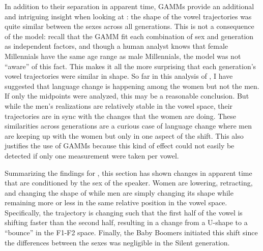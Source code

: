 In addition to their separation in apparent time, GAMMs provide an additional and intriguing insight when looking at \bet: the shape of the vowel trajectories was quite similar between the sexes across all generations. This is not a consequence of the model: recall that the GAMM fit each combination of sex and generation as independent factors, and though a human analyst knows that female Millennials have the same age range as male Millennials, the model was not ``aware'' of this fact. This makes it all the more surprising that each generation's vowel trajectories were similar in shape. So far in this analysis of \bet, I have suggested that language change is happening among the women but not the men. If only the midpoints were analyzed, this may be a reasonable conclusion. But while the men's realizations are relatively stable in the vowel space, their trajectories are in sync with the changes that the women are doing. These similarities across generations are a curious case of language change where men are keeping up with the women but only in one aspect of the shift. This also justifies the use of GAMMs because this kind of effect could not easily be detected if only one measurement were taken per vowel.

Summarizing the findings for \bet, this section has shown changes in apparent time that are conditioned by the sex of the speaker. Women are lowering, retracting, and changing the shape of \bet while men are simply changing its shape while remaining more or less in the same relative position in the vowel space. Specifically, the trajectory is changing such that the first half of the vowel is shifting faster than the second half, resulting in a change from a U-shape to a “bounce” in the F1-F2 space. Finally, the Baby Boomers initiated this shift since the differences between the sexes was negligible in the Silent generation.




\section{\bit}
\label{BIT}


